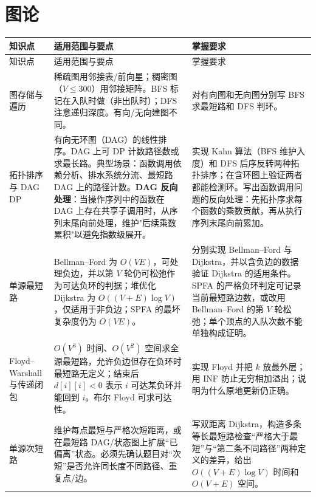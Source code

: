 \documentclass[a4paper,11pt]{article}
\begin{document}
\newpage
\section{图论}

\begin{longtable}{L{2.4cm} L{7.5cm} L{6.8cm}}
\toprule
知识点 & 适用范围与要点 & 掌握要求 \\
\midrule
\endfirsthead
\toprule
知识点 & 适用范围与要点 & 掌握要求 \\
\midrule
\endhead
\endfoot
\bottomrule
\endlastfoot

图存储与遍历
& 稀疏图用邻接表/前向星；稠密图（$V\le300$）用邻接矩阵。BFS 标记在入队时做（非出队时）；DFS 注意递归深度。有向/无向建图不同。
& 对有向图和无向图分别写 BFS 求最短路和 DFS 判环。\\[2mm]

拓扑排序与 DAG DP
& 有向无环图（DAG）的线性排序。DAG 上可 DP 计数路径数或求最长路。典型场景：函数调用依赖分析、排水系统分流、最短路 DAG 上的路径计数。\textbf{DAG 反向处理}：当操作序列中的函数在 DAG 上存在共享子调用时，从序列末尾向前处理，维护"后续乘数累积"以避免指数级展开。
& 实现 Kahn 算法（BFS 维护入度）和 DFS 后序反转两种拓扑排序；在含环图上验证两者都能检测环。写出函数调用问题的反向处理：先拓扑序求每个函数的乘数贡献，再从执行序列末尾向前累加。\\[2mm]

单源最短路
& Bellman--Ford 为 $O(VE)$，可处理负边，并以第 $V$ 轮仍可松弛作为可达负环的判据；堆优化 Dijkstra 为 $O((V+E)\log V)$，仅适用于非负边；SPFA 的最坏复杂度仍为 $O(VE)$。
& 分别实现 Bellman--Ford 与 Dijkstra，并以含负边的数据验证 Dijkstra 的适用条件。SPFA 的严格负环判定可记录当前最短路边数，或改用 Bellman--Ford 的第 $V$ 轮松弛；单个顶点的入队次数不能单独构成证明。\\[2mm]

Floyd--Warshall 与传递闭包
& $O(V^3)$ 时间、$O(V^2)$ 空间求全源最短路，允许负边但存在负环时最短路无定义；结束后 $d[i][i]<0$ 表示 $i$ 可达某负环并能回到 $i$。布尔 Floyd 可求可达性。
& 实现 Floyd 并把 $k$ 放最外层；用 INF 防止无穷相加溢出；说明为什么原地更新仍正确。\\[2mm]

单源次短路
& 维护每点最短与严格次短距离，或在最短路 DAG/状态图上扩展“已偏离”状态。必须先确认题目对“次短”是否允许同长度不同路径、重复点/边。
& 写双距离 Dijkstra，构造多条等长最短路检查“严格大于最短”与“第二条不同路径”两种定义的差异，给出 $O((V+E)\log V)$ 时间和 $O(V+E)$ 空间。\\[2mm]


\end{longtable}
\end{document}
